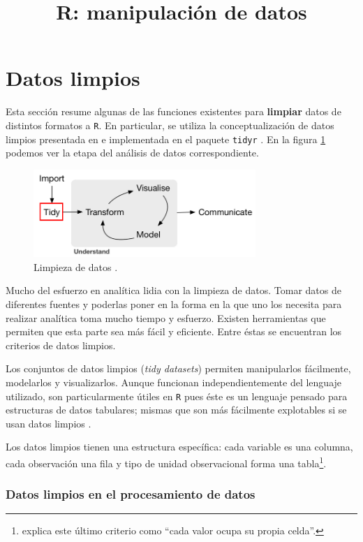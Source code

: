 \documentclass[]{article}
\title{R: manipulación de datos}
\author{}
\date{}
\let\rmarkdownfootnote\footnote%
\def\footnote{\protect\rmarkdownfootnote}
\begin{document}
\section{Datos limpios}\label{datos-limpios}

Esta sección resume algunas de las funciones existentes para
\textbf{limpiar} datos de distintos formatos a \texttt{R}. En
particular, se utiliza la conceptualización de datos limpios presentada
en \textcite{wickham2014tidy} e implementada en el paquete
\texttt{tidyr} \parencite{tidyr}. En la figura \ref{fig:ciclo2} podemos
ver la etapa del análisis de datos correspondiente.

\begin{figure}[h]
    \centering
    \includegraphics[width=0.75\textwidth]{../img/02_ciclo_2.png}
    \caption{Limpieza de datos \textcite[Introducción]{grolemund2016r}.}
    \label{fig:ciclo2}
\end{figure}

Mucho del esfuerzo en analítica lidia con la limpieza de datos. Tomar
datos de diferentes fuentes y poderlas poner en la forma en la que uno
los necesita para realizar analítica toma mucho tiempo y esfuerzo.
Existen herramientas que permiten que esta parte sea más fácil y
eficiente. Entre éstas se encuentran los criterios de datos limpios.

Los conjuntos de datos limpios (\emph{tidy datasets}) permiten
manipularlos fácilmente, modelarlos y visualizarlos. Aunque funcionan
independientemente del lenguaje utilizado, son particularmente útiles en
\texttt{R} pues éste es un lenguaje pensado para estructuras de datos
tabulares; mismas que son más fácilmente explotables si se usan datos
limpios \parencite{wickham2016r}.

Los datos limpios tienen una estructura específica: cada variable es una
columna, cada observación una fila y tipo de unidad observacional forma
una
tabla\footnote{\textcite[][sección Data Tidying]{wickham2016r} explica este último criterio como ``cada valor ocupa su propia celda''.}.

\subsubsection{Datos limpios en el procesamiento de
datos}\label{datos-limpios-en-el-procesamiento-de-datos}
\end{document}
